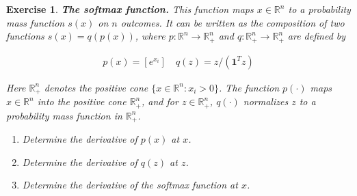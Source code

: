 \documentclass[12pt]{article}
\theoremstyle{colon}
\newtheorem{exercise}{Exercise}
\begin{document}
\begin{exercise}
  \textbf{The softmax function.} This function maps $x \in \mathbb{R}^n$ to a probability mass function $s(x)$ on $n$ outcomes. It can be written as the composition of two functions $s(x) = q(p(x))$, where $p: \mathbb{R}^n \rightarrow \mathbb{R}_+^n$ and $q: \mathbb{R}_+^n \rightarrow \mathbb{R}_+^n$ are defined by

  \begin{gather*}
    p(x) = [e^{x_i}] \quad q(z) = z/(\bm{1}^T z)
  \end{gather*}

  Here $\mathbb{R}_+^n$ denotes the positive cone $\{ x \in \mathbb{R}^n: x_i > 0 \}$. The function $p(\cdot)$ maps $x \in \mathbb{R}^n$ into the positive cone $\mathbb{R}_+^n$, and for $z \in \mathbb{R}_+^n$, $q(\cdot)$ normalizes $z$ to a probability mass function in $\mathbb{R}_+^n$.

  \begin{enumerate}[label=\alph*)]
    \item Determine the derivative of $p(x)$ at $x$.
    \item Determine the derivative of $q(z)$ at $z$.
    \item Determine the derivative of the softmax function at $x$.
  \end{enumerate}
\end{exercise}
\end{document}
